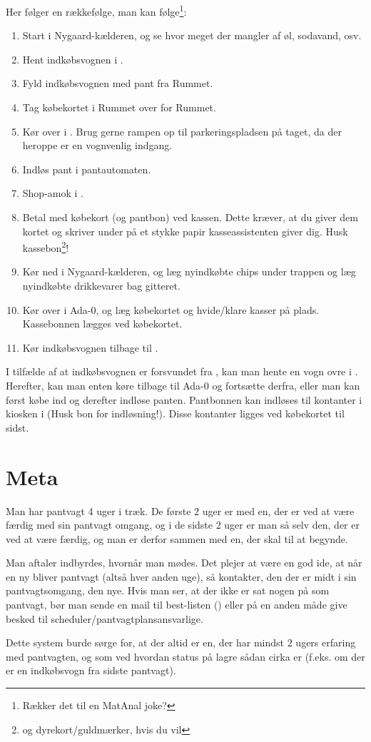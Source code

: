 Her følger en rækkefølge, man kan følge\footnote{Rækker det til en MatAnal joke?}:

\begin{enumerate}
\item Start i Nygaard-kælderen, og se hvor meget der mangler af øl,
  sodavand, osv.
\item Hent indkøbsvognen i \shoppingcartloc.
\item Fyld indkøbsvognen med pant fra Rummet.
\item Tag købekortet i Rummet over for Rummet.
\item Kør over i \fotex. Brug gerne rampen op til parkeringspladsen på
  taget, da der heroppe er en vognvenlig indgang.
\item Indløs pant i pantautomaten.
\item Shop-amok i \fotex.
\item Betal med købekort (og pantbon) ved kassen. Dette kræver, at du
  giver dem kortet og skriver under på et stykke papir
  kasseassistenten giver dig. Husk kassebon\footnote{og
    dyrekort/guldmærker, hvis du vil}!
\item Kør ned i Nygaard-kælderen, og læg nyindkøbte chips under
  trappen og læg nyindkøbte drikkevarer bag gitteret.
\item Kør over i Ada-0, og læg købekortet og hvide/klare kasser på
  plads. Kassebonnen lægges ved købekortet.
\item Kør indkøbsvognen tilbage til \shoppingcartloc.
\end{enumerate}

I tilfælde af at indkøbsvognen er forsvundet fra \shoppingcartloc, kan man hente en vogn ovre i \fotex. Herefter, kan man
enten køre tilbage til Ada-0 og fortsætte derfra, eller man kan først
købe ind og derefter indløse panten. Pantbonnen kan indløses til
kontanter i kiosken i \fotex (Husk bon for indløsning!). Disse
kontanter ligges ved købekortet til sidst.

\section{Meta}
\label{sec:meta}

Man har pantvagt 4 uger i træk. De første 2 uger er med en, der er ved
at være færdig med sin pantvagt omgang, og i de sidste 2 uger er man
så selv den, der er ved at være færdig, og man er derfor sammen med
en, der skal til at begynde.

Man aftaler indbyrdes, hvornår man mødes. Det plejer at være en god
ide, at når en ny bliver pantvagt (altså hver anden uge), så
kontakter, den der er midt i sin pantvagtsomgang, den nye. Hvis man
ser, at der ikke er sat nogen på som pantvagt, bør man sende en mail
til best-listen () eller på en anden måde
give besked til scheduler/pantvagtplansansvarlige.

Dette system burde sørge for, at der altid er en, der har mindst 2
ugers erfaring med pantvagten, og som ved hvordan status på lagre
sådan cirka er (f.eks. om der er en indkøbsvogn fra sidste pantvagt).



